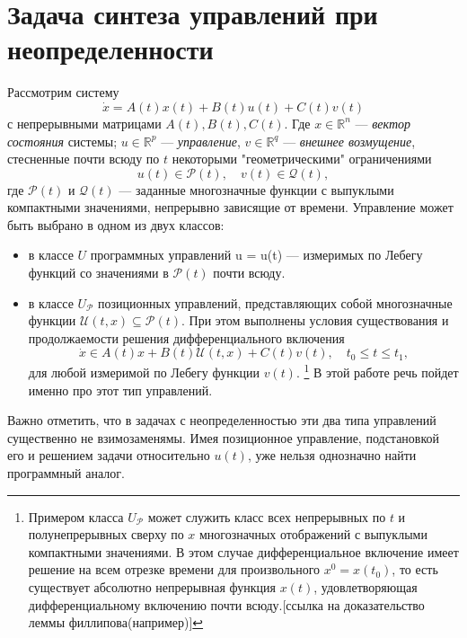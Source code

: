 \section{Задача синтеза управлений при неопределенности}

Рассмотрим систему
\begin{equation}\label{problem}
    \dot{x} = A(t)x(t) + B(t)u(t) + C(t)v(t)
\end{equation}
с непрерывными матрицами \( A(t), B(t), C(t) \). Где \( x \in \mathbb{R}^n \)
 --- \emph{вектор состояния} системы; \( u \in \mathbb{R}^p \) --- 
 \emph{управление}, \( v \in \mathbb{R}^q \) --- \emph{внешнее возмущение},
 стесненные почти всюду по \( t \) некоторыми "геометрическими" ограничениями
\[
    u(t) \in \mathcal{P}(t), \quad v(t) \in \mathcal{Q}(t),
\]
 где \( \mathcal{P}(t) \) и \( \mathcal{Q}(t) \) --- заданные многозначные
 функции с выпуклыми компактными значениями, непрерывно зависящие от времени. 
Управление может быть выбрано в одном из двух классов:
\begin{itemize}
    \item в классе \( U \) программных управлений u = u(t) --- измеримых по
     Лебегу функций со значениями в \( \mathcal{P}(t) \) почти всюду.
    \item в классе \( U_\mathcal{P} \) позиционных управлений, представляющих
     собой многозначные функции \( \mathcal{U}(t,x) \subseteq
     \mathcal{P}(t) \). При этом выполнены условия существования и
     продолжаемости решения дифференциального включения
    \begin{equation}\label{dif_inclusion}
        \dot{x} \in A(t)x + B(t)\mathcal{U}(t,x) + C(t)v(t), \quad
         t_0 \le t \le t_1, 
    \end{equation}
    для любой измеримой по Лебегу функции \( v(t) \). \footnote{Примером класса
     \( U_\mathcal{P} \) может служить класс всех непрерывных по \( t \) и
     полунепрерывных сверху по \( x \) многозначных отображений с выпуклыми
     компактными значениями. В этом случае дифференциальное включение имеет
     решение на всем отрезке времени для произвольного \( x^0 = x(t_0) \),
     то есть существует абсолютно непрерывная функция \( x(t) \),
     удовлетворяющая дифференциальному включению почти всюду.[ссылка на
     доказательство леммы филлипова(например)]} В этой работе речь пойдет 
     именно про этот тип управлений.
\end{itemize}
Важно отметить, что в задачах с неопределенностью эти два типа управлений
 существенно не взимозаменямы. Имея позиционное управление, подстановкой его
 и решением задачи относительно \( u(t) \), уже нельзя однозначно найти
 программный аналог.


